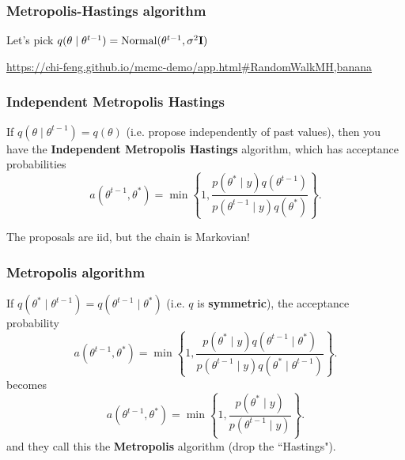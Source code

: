 \documentclass{beamer}
\begin{document}
\begin{frame}
\frametitle{Metropolis-Hastings algorithm}

Let's pick $q(\theta \mid \theta^{t-1}) = \text{Normal}(\theta^{t-1}, \sigma^2 {\bf I} )$
\newline

\url{https://chi-feng.github.io/mcmc-demo/app.html\#RandomWalkMH,banana}
\end{frame}



\begin{frame}
\frametitle{Independent Metropolis Hastings}

If $q(\theta \mid \theta^{t-1}) = q(\theta)$ (i.e. propose independently of past values), then you have the {\bf Independent Metropolis Hastings} algorithm, which has acceptance probabilities
$$
a(\theta^{t-1}, \theta^*) = \min\left\{1, \frac{p(\theta^* \mid y)q(\theta^{t-1} ) }{p(\theta^{t-1} \mid y) q(\theta^* ) } \right\}.
$$

The proposals are iid, but the chain is Markovian!

\end{frame}

\begin{frame}
\frametitle{Metropolis algorithm}

If $q(\theta^* \mid \theta^{t-1}) = q(\theta^{t-1} \mid \theta^*)$ (i.e. $q$ is {\bf symmetric}), the acceptance probability
$$
a(\theta^{t-1}, \theta^*) = \min\left\{1, \frac{p(\theta^* \mid y)q(\theta^{t-1} \mid \theta^*) }{p(\theta^{t-1} \mid y) q(\theta^* \mid \theta^{t-1}) }\right\}.
$$
becomes
$$
a(\theta^{t-1}, \theta^*) = \min\left\{1, \frac{p(\theta^* \mid y)}{p(\theta^{t-1} \mid y)  }\right\}.
$$
and they call this the {\bf Metropolis} algorithm (drop the ``Hastings").

\end{frame}
\end{document}
